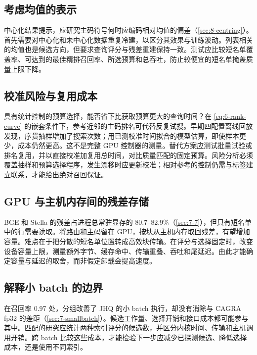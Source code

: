 \subsection{考虑均值的表示}

中心化结果提示，应研究主码符号何时应编码相对均值的偏差（\cref{sec:8-centring}）。首先需要对中心化和未中心化数据重复冷建，以区分其效果与训练波动。列表相关的均值也是候选方向，但要求查询评分与残差重建保持一致。测试应比较短名单覆盖率、可达到的最佳精排召回率、所选预算和总吞吐，防止较便宜的短名单掩盖质量上限下降。

\subsection{校准风险与复用成本}

具有统计控制的预算选择，能否省下比获取预算更大的查询时间？在 \cref{eq:6-rank-curve} 的嵌套条件下，参考近邻的主码排名可代替反复试搜。早期四配置离线回放发现，序贯抽样增加了搜索次数；用已测校准时间拟合的模型估算，即使样本更少，成本仍然更高。这不是完整 GPU 控制器的测量。替代方案应测试批量试验或排名复用，并以直接校准加复用总时间，对比质量匹配的固定预算。风险分析必须覆盖抽样和预算选择程序，发生漂移时应更新校准；相对参考的控制仍需与标签建立联系，才能给出绝对召回保证。

\subsection{GPU 与主机内存间的残差存储}

BGE 和 Stella 的残差占进程总常驻显存的 80.7--82.9\%（\cref{sec:7-7}），但只有短名单中的行需要读取。将路由和主码留在 GPU，按块从主机内存取回残差，有望增加容量。难点在于把分散的短名单位置转成高效块传输。在评分与选择固定时，改变设备容量上限，测量额外字节、缓存命中、传输重叠、吞吐和尾延迟。由此才能确定容量与延迟的取舍，而非假定卸载会提高速度。

\subsection{解释小 batch 的边界}

在召回率 0.97 处，分组改善了 JHQ 的小 batch 执行，却没有消除与 CAGRA fp32 的差距（\cref{sec:7-smallbatch}）。候选工作量、选择开销和接口成本都可能参与其中。匹配的研究应统计两种索引评分的候选数，并区分内核时间、传输和主机调用开销。跨 batch 比较这些成本，才能检验下一步应减少已探测候选、降低选择成本，还是使用不同索引。
